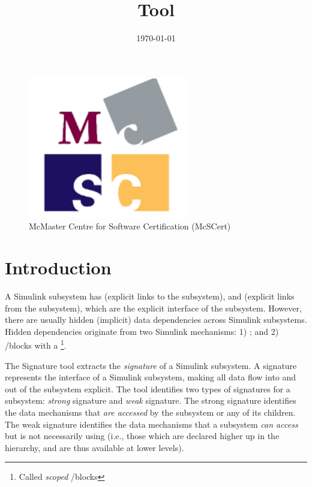 \documentclass{article}
\title{\ToolName Tool}
\date{\monthyeardate\today}
\makeatletter
\newcommand{\ToolName}{Signature\@\xspace}
\makeatother
\begin{document}
\maketitle
\vfill

\begin{figure}
	\centering
	\includegraphics[]{../figs/McSCert_Logo.pdf} \\
	McMaster Centre for Software Certification (McSCert)
\end{figure}

\newpage

\section{Introduction}

A Simulink subsystem has  (explicit links to the subsystem), and  (explicit links from the subsystem), which are the explicit interface of the subsystem. However, there are usually hidden (implicit) data dependencies across Simulink subsystems. Hidden dependencies originate from two Simulink mechanisms: 1) \DSM; and 2) \goto/\from blocks with a \footnote{Called \emph{scoped} \goto/\from blocks}. 

The \ToolName tool extracts the \emph{signature} of a Simulink subsystem. A signature represents the interface of a Simulink subsystem, making all data flow into and out of the subsystem explicit. The tool identifies two types of signatures for a subsystem: \emph{strong} signature and \emph{weak} signature. The strong signature identifies the data mechanisms that \emph{are accessed} by the subsystem or any of its children. The weak signature identifies the data mechanisms that a subsystem \emph{can access} but is not necessarily using (i.e., those which are declared higher up in the hierarchy, and are thus available at lower levels). 
\end{document}
